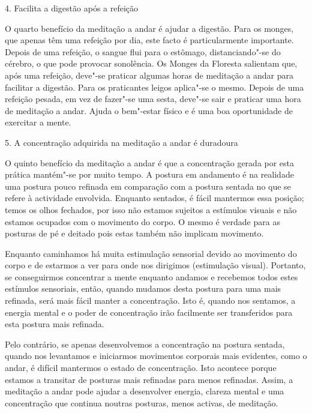 \begin{siderule-quote}
  4. Facilita a digestão após a refeição
\end{siderule-quote}

O quarto benefício da meditação a andar é ajudar a digestão. Para os
monges, que apenas têm uma refeição por dia, este facto é
particularmente importante. Depois de uma refeição, o sangue flui para o
estômago, distanciando"-se do cérebro, o que pode provocar sonolência. Os
Monges da Floresta salientam que, após uma refeição, deve"-se praticar
algumas horas de meditação a andar para facilitar a digestão. Para os
praticantes leigos aplica"-se o mesmo. Depois de uma refeição pesada, em
vez de fazer"-se uma sesta, deve"-se sair e praticar uma hora de meditação
a andar. Ajuda o bem"-estar físico e é uma boa oportunidade de exercitar
a mente.

\begin{siderule-quote}
  5. A concentração adquirida na meditação a andar é duradoura
\end{siderule-quote}

O quinto benefício da meditação a andar é que a concentração gerada por
esta prática mantém"-se por muito tempo. A postura em andamento é na
realidade uma postura pouco refinada em comparação com a postura sentada
no que se refere à actividade envolvida. Enquanto sentados, é fácil
mantermos essa posição; temos os olhos fechados, por isso não estamos
sujeitos a estímulos visuais e não estamos ocupados com o movimento do
corpo. O mesmo é verdade para as posturas de pé e deitado pois estas
também não implicam movimento.

Enquanto caminhamos há muita estimulação sensorial devido ao movimento
do corpo e de estarmos a ver para onde nos dirigimos (estimulação
visual). Portanto, se conseguirmos concentrar a mente enquanto andamos e
recebemos todos estes estímulos sensoriais, então, quando mudamos desta
postura para uma mais refinada, será mais fácil manter a concentração.
Isto é, quando nos sentamos, a energia mental e o poder de concentração
irão facilmente ser transferidos para esta postura mais refinada.

Pelo contrário, se apenas desenvolvemos a concentração na postura
sentada, quando nos levantamos e iniciarmos movimentos corporais mais
evidentes, como o andar, é difícil mantermos o estado de concentração.
Isto acontece porque estamos a transitar de posturas mais refinadas para
menos refinadas. Assim, a meditação a andar pode ajudar a desenvolver
energia, clareza mental e uma concentração que continua noutras
posturas, menos activas, de meditação.

